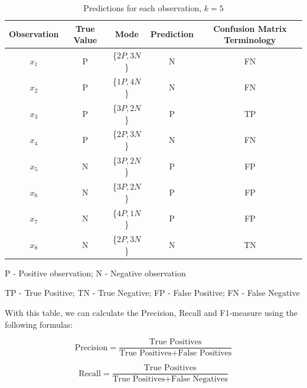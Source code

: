 \documentclass[12pt]{article}
\begin{document}
\begin{enumerate}[leftmargin=\labelsep]
    \begin{table}[H]
        \begin{center}
            \begin{threeparttable}
            \begin{tabular}{c|c|c|c|c}
                Observation & True Value & Mode & Prediction & Confusion Matrix Terminology\\
                \hline
                $x_1$ & P &\{$2P, 3N$\}& N & FN\\
                $x_2$ & P &\{$1P, 4N$\}& N & FN\\
                $x_3$ & P &\{$3P, 2N$\}& P & TP\\
                $x_4$ & P &\{$2P, 3N$\}& N & FN\\
                $x_5$ & N &\{$3P, 2N$\}& P & FP\\
                $x_6$ & N &\{$3P, 2N$\}& P & FP\\
                $x_7$ & N &\{$4P, 1N$\}& P & FP\\
                $x_8$ & N &\{$2P, 3N$\}& N & TN\\
            \end{tabular}
            \begin{tablenotes}
                \small
                \item[]
                \item[P - Positive observation; N - Negative observation]  
                \item[TP - True Positive; TN - True Negative; FP - False Positive; FN - False Negative] 
                \item[] 
            \end{tablenotes}
        \end{threeparttable}
            \caption{Predictions for each observation, $k=5$}
        \end{center}
    \end{table}

    With this table, we can calculate the Precision, Recall and F1-measure using the following formulas:

    \begin{equation}\label{precision}
        \text{Precision} = \frac{\text{True Positives}}{{\text{True Positives} +
        \text{False Positives}}}
    \end{equation}

    \begin{equation}\label{recall}
        \text{Recall} = \frac{\text{True Positives}}{{\text{True Positives} + \text{False Negatives}}}
    \end{equation}


\end{enumerate}
\end{document}
